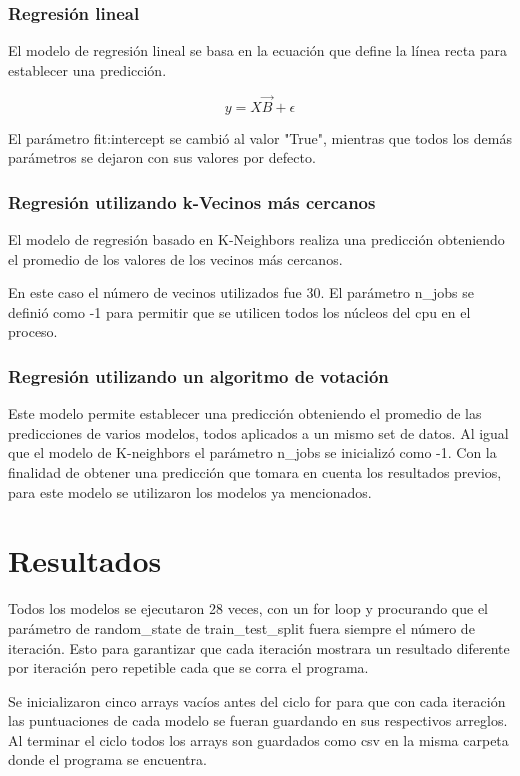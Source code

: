 \documentclass[sigconf,authorversion,nonacm]{acmart}
\begin{document}
\subsubsection{Regresión lineal}
El modelo de regresión lineal se basa en la ecuación que define la línea recta para establecer una predicción.

$$y = X\vec{B} + \epsilon$$

El parámetro fit:intercept se cambió al valor "True", mientras que todos los demás parámetros se dejaron con sus valores por defecto.

\subsubsection{Regresión utilizando k-Vecinos más cercanos}
El modelo de regresión basado en K-Neighbors realiza una predicción obteniendo el promedio de los valores de los vecinos más cercanos.

En este caso el número de vecinos utilizados fue 30. El parámetro n\_jobs se definió como -1 para permitir que se utilicen todos los núcleos del cpu en el proceso.

\subsubsection{Regresión utilizando un algoritmo de votación}
Este modelo permite establecer una predicción obteniendo el promedio de las predicciones de varios modelos, todos aplicados a un mismo set de datos.
Al igual que el modelo de K-neighbors el parámetro n\_jobs se inicializó como -1.
Con la finalidad de obtener una predicción que tomara en cuenta los resultados previos, para este modelo se utilizaron los modelos ya mencionados.


\section{Resultados}
Todos los modelos se ejecutaron 28 veces, con un for loop y procurando que el parámetro de random\_state de train\_test\_split fuera siempre el número de iteración. Esto para garantizar que cada iteración mostrara un resultado diferente por iteración pero repetible cada que se corra el programa.

Se inicializaron cinco arrays vacíos antes del ciclo for para que con cada iteración las puntuaciones de cada modelo se fueran guardando en sus respectivos arreglos. Al terminar el ciclo todos los arrays son guardados como csv en la misma carpeta donde el programa se encuentra.
\end{document}
